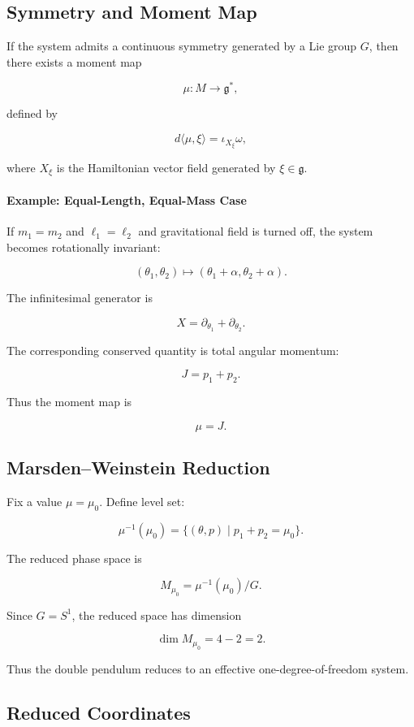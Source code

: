 \documentclass[11pt]{article}
\begin{document}
\subsection{Symmetry and Moment Map}

If the system admits a continuous symmetry generated by a Lie group $G$,
then there exists a moment map

\[
\mu : M \to \mathfrak{g}^*,
\]

defined by

\[
d\langle \mu, \xi \rangle
=
\iota_{X_\xi} \omega,
\]

where $X_\xi$ is the Hamiltonian vector field
generated by $\xi \in \mathfrak{g}$.

\paragraph{Example: Equal-Length, Equal-Mass Case}

If $m_1=m_2$ and $\ell_1=\ell_2$
and gravitational field is turned off,
the system becomes rotationally invariant:

\[
(\theta_1,\theta_2) \mapsto (\theta_1+\alpha,\theta_2+\alpha).
\]

The infinitesimal generator is

\[
X = \partial_{\theta_1} + \partial_{\theta_2}.
\]

The corresponding conserved quantity is total angular momentum:

\[
J = p_1 + p_2.
\]

Thus the moment map is

\[
\mu = J.
\]

\subsection{Marsden--Weinstein Reduction}

Fix a value $\mu = \mu_0$.
Define level set:

\[
\mu^{-1}(\mu_0)
=
\{( \theta,p ) \mid p_1 + p_2 = \mu_0 \}.
\]

The reduced phase space is

\[
M_{\mu_0}
=
\mu^{-1}(\mu_0) / G.
\]

Since $G = S^1$,
the reduced space has dimension

\[
\dim M_{\mu_0} = 4 - 2 = 2.
\]

Thus the double pendulum reduces to
an effective one-degree-of-freedom system.

\subsection{Reduced Coordinates}
\end{document}
